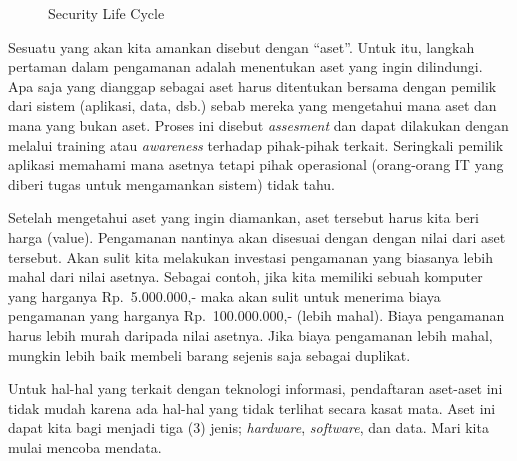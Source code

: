 \begin{figure}[ht]
\caption{Security Life Cycle}
\label{fig:security-life-cycle}
\end{figure}

Sesuatu yang akan kita amankan disebut dengan ``aset''. Untuk itu, langkah
pertaman dalam pengamanan adalah menentukan aset yang ingin dilindungi. Apa saja
yang dianggap sebagai aset harus ditentukan bersama dengan pemilik dari sistem
(aplikasi, data, dsb.) sebab mereka yang mengetahui mana aset dan mana yang
bukan aset.
Proses ini disebut {\em assesment} dan dapat dilakukan dengan melalui training
atau {\em awareness} terhadap pihak-pihak terkait. Seringkali pemilik aplikasi
memahami mana asetnya tetapi pihak operasional (orang-orang IT yang diberi
tugas untuk mengamankan sistem) tidak tahu.

Setelah mengetahui aset yang ingin diamankan, aset tersebut harus kita beri
harga (value). Pengamanan nantinya akan disesuai dengan dengan nilai dari aset
tersebut. Akan sulit kita melakukan investasi pengamanan yang biasanya lebih
mahal dari nilai asetnya. Sebagai contoh, jika kita memiliki sebuah komputer
yang harganya Rp.~5.000.000,- maka akan sulit untuk menerima biaya pengamanan
yang harganya Rp.~100.000.000,- (lebih mahal). Biaya pengamanan harus lebih
murah daripada nilai asetnya. Jika biaya pengamanan lebih mahal, mungkin lebih
baik membeli barang sejenis saja sebagai duplikat.

Untuk hal-hal yang terkait dengan teknologi informasi, pendaftaran aset-aset
ini tidak mudah karena ada hal-hal yang tidak terlihat secara kasat mata.  Aset
ini dapat kita bagi menjadi tiga (3) jenis; {\em hardware}, {\em software}, dan
data. Mari kita mulai mencoba mendata.

